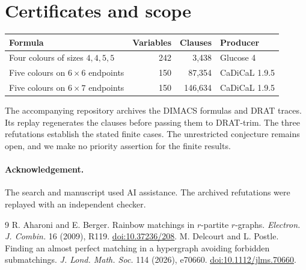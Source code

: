 \documentclass[10pt]{article}
\begin{document}
\section{Certificates and scope}
\begin{center}
\begin{tabular}{lrrl}
Formula & Variables & Clauses & Producer \\ \hline
Four colours of sizes \(4,4,5,5\) & 242 & 3,438 & Glucose 4 \\
Five colours on \(6\times6\) endpoints & 150 & 87,354 & CaDiCaL 1.9.5 \\
Five colours on \(6\times7\) endpoints & 150 & 146,634 & CaDiCaL 1.9.5
\end{tabular}
\end{center}
The accompanying repository archives the DIMACS formulas and DRAT traces.
Its replay regenerates the clauses before passing them to DRAT-trim.
The three refutations establish the stated finite cases. The unrestricted
conjecture remains open, and we make no priority assertion for the finite
results.

\paragraph{Acknowledgement.}
The search and manuscript used AI assistance. The archived refutations
were replayed with an independent checker.

\begin{thebibliography}{9}
 R. Aharoni and E. Berger. Rainbow matchings in \(r\)-partite
\(r\)-graphs. \emph{Electron. J. Combin.} 16 (2009), R119.
\href{https://doi.org/10.37236/208}{doi:10.37236/208}.
 M. Delcourt and L. Postle. Finding an almost perfect matching
in a hypergraph avoiding forbidden submatchings. \emph{J. Lond. Math. Soc.}
114 (2026), e70660. \href{https://doi.org/10.1112/jlms.70660}{doi:10.1112/jlms.70660}.
\end{thebibliography}
\end{document}
